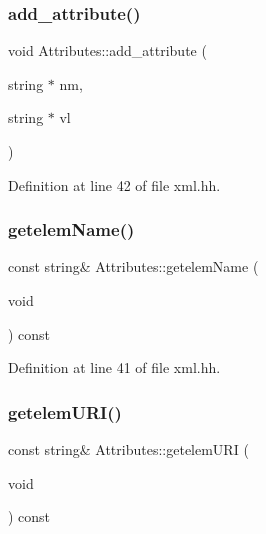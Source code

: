 \subsubsection{\texorpdfstring{add\_attribute()}{add\_attribute()}}
{\footnotesize\ttfamily void Attributes\+::add\+\_\+attribute (\begin{DoxyParamCaption}\item[{string $\ast$}]{nm,  }\item[{string $\ast$}]{vl }\end{DoxyParamCaption})\hspace{0.3cm}{\ttfamily [inline]}}



Definition at line 42 of file xml.\+hh.

\mbox{\label{class_attributes_a0099cc604008a7ae3ee8f85f4e241848}} 
\subsubsection{\texorpdfstring{getelemName()}{getelemName()}}
{\footnotesize\ttfamily const string\& Attributes\+::getelem\+Name (\begin{DoxyParamCaption}\item[{void}]{ }\end{DoxyParamCaption}) const\hspace{0.3cm}{\ttfamily [inline]}}



Definition at line 41 of file xml.\+hh.

\mbox{\label{class_attributes_aeffc6eecf52d20af15ea95a6b2f66419}} 
\subsubsection{\texorpdfstring{getelemURI()}{getelemURI()}}
{\footnotesize\ttfamily const string\& Attributes\+::getelem\+U\+RI (\begin{DoxyParamCaption}\item[{void}]{ }\end{DoxyParamCaption}) const\hspace{0.3cm}{\ttfamily [inline]}}



